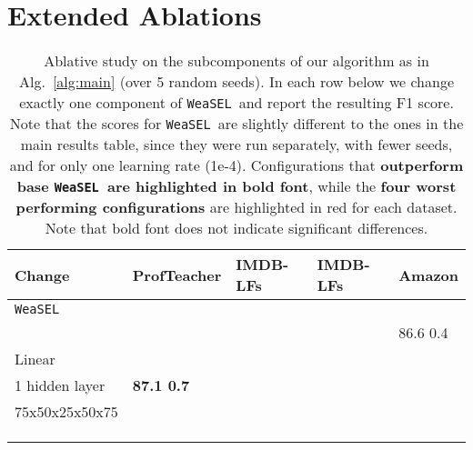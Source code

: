 \documentclass{article}
\newcommand{\weasel}{\texttt{WeaSEL}}\newcommand{\brackets}[1]{\left( #1 \right)}
\newcommand{\Abl}[2]{{#1  #2}}
\newcommand{\emphAbl}[2]{{\textbf{#1  #2}}}
\begin{document}
\section{Extended Ablations} \label{sec:ablationsAppendix}
\begin{table}
\centering
\caption{Ablative study on the subcomponents of our algorithm as in Alg.~\ref{alg:main} (over 5 random seeds). In each row below we change exactly one component of \weasel\, and report the resulting F1 score. Note that the scores for \weasel\ are slightly different to the ones in the main results table, since they were run separately, with fewer seeds, and for only one learning rate (1e-4). Configurations that \textbf{outperform base \weasel\ are highlighted in bold font}, while the \color{red}\textbf{four worst performing configurations }\color{black} are highlighted in red for each dataset. Note that bold font does not indicate significant differences.}
\vspace{5pt}
\label{tab:fullAbl}
\begin{tabular}{@{} *5l @{}}
\toprule
    Change  & 
        ProfTeacher & IMDB- \small{LFs} & IMDB- \small{LFs} & Amazon \\ 
    \midrule
    \weasel & 
         &  &   &  \\ 
    \midrule
     & 
         &  &  & \Abl{86.6}{0.4} \\
    Linear  &
         &  &  &   \\
    1 hidden layer  &
        \emphAbl{87.1}{0.7} &  &  & \\
    75x50x25x50x75  &
         &  &  &  \\
       & 
         &  &  &  \\ 
       & 
         &  &  &  \\ 
       & 
         &  &  &   \\
        

\end{tabular}
\end{table}
\end{document}

